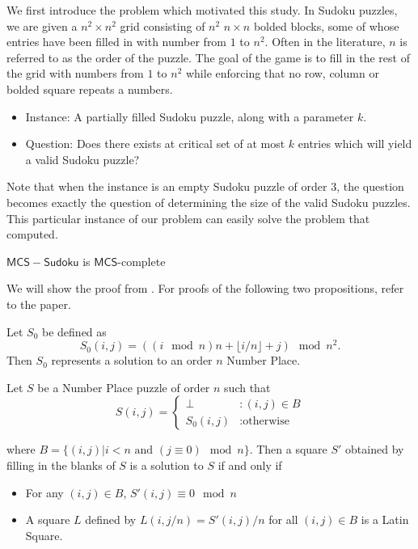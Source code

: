 \documentclass[runningheads,a4paper]{llncs}
\begin{document}
We first introduce the problem which motivated this study. In Sudoku puzzles, we are given a $n^2 \times n^2$ grid consisting of $n^2$ $n \times n$ bolded blocks, some of whose entries have been filled in with number from $1$ to $n^2$. Often in the literature, $n$ is referred to as the order of the puzzle. The goal of the game is to fill in the rest of the grid with numbers from $1$ to $n^2$ while enforcing that no row, column or bolded square repeats a numbers. 

\begin{itemize}
\item Instance: A partially filled Sudoku puzzle, along with a parameter $k$.
\item Question: Does there exists at critical set of at most $k$ entries which will yield a valid Sudoku puzzle?
\end{itemize}

Note that when the instance is an empty Sudoku puzzle of order 3, the question becomes exactly the question of determining the size of the valid Sudoku puzzles. This particular instance of our problem can easily solve the problem that \cite{mcguire2012there} computed. 

\begin{theorem}
$\mathsf{MCS-Sudoku}$ is $\mathsf{MCS}$-complete
\end{theorem}

We will show the proof from \cite{takayuki2003complexity}. For proofs of the following two propositions, refer to the paper. 

\begin{proposition}
Let $S_0$ be defined as
$$S_0 (i,j) = ((i \mod n) n + \lfloor i/n \rfloor + j) \mod n^2. $$
Then $S_0$ represents a solution to an order $n$ Number Place. 
\end{proposition}

\begin{proposition}
Let $S$ be a Number Place puzzle of order $n$ such that
\begin{displaymath}
S(i,j) = \left\{
\begin{array}{lr}
\perp & : (i,j) \in B\\
S_0 (i,j) & : \text{otherwise}
\end{array}
\right.
\end{displaymath}

where $B = \{ (i,j) | i < n \text{ and } (j \equiv 0) \mod n \}$. Then a square $S'$ obtained by filling in the blanks of $S$ is a solution to $S$ if and only if

\begin{itemize}
\item For any $(i,j) \in B$, $S'(i,j) \equiv 0 \mod n$
\item A square $L$ defined by $L(i, j/n) = S'(i,j)/n$ for all $(i, j) \in B$ is a Latin Square.
\end{itemize}

\end{proposition}
\end{document}
